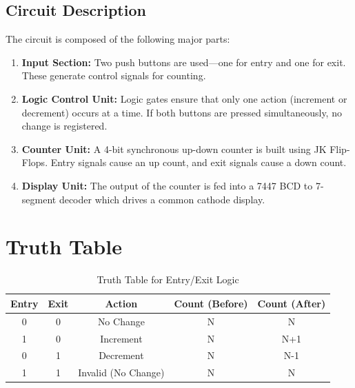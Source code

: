 \documentclass[a4paper,12pt]{article}
\begin{document}
\subsection{Circuit Description}
The circuit is composed of the following major parts:
\begin{enumerate}
    \item \textbf{Input Section:} Two push buttons are used—one for entry and one for exit. These generate control signals for counting.
    \item \textbf{Logic Control Unit:} Logic gates ensure that only one action (increment or decrement) occurs at a time. If both buttons are pressed simultaneously, no change is registered.
    \item \textbf{Counter Unit:} A 4-bit synchronous up-down counter is built using JK Flip-Flops. Entry signals cause an up count, and exit signals cause a down count.
    \item \textbf{Display Unit:} The output of the counter is fed into a 7447 BCD to 7-segment decoder which drives a common cathode display.
\end{enumerate}

\section{Truth Table}
\begin{table}[h]
\centering
\begin{tabular}{|c|c|c|c|c|}
    \hline
    \textbf{Entry} & \textbf{Exit} & \textbf{Action} & \textbf{Count (Before)} & \textbf{Count (After)} \\
    \hline
    0 & 0 & No Change & N & N \\
    1 & 0 & Increment & N & N+1 \\
    0 & 1 & Decrement & N & N-1 \\
    1 & 1 & Invalid (No Change) & N & N \\
    \hline
\end{tabular}
\caption{Truth Table for Entry/Exit Logic}
\end{table}
\end{document}
